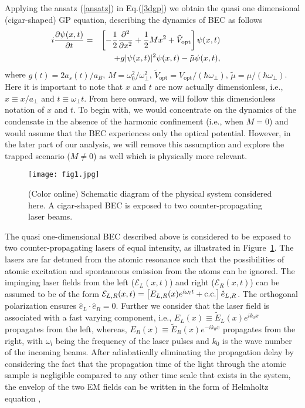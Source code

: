 \documentclass[epj]{svjour}
\begin{document}
Applying the ansatz (\ref{ansatz}) in Eq.(\ref{3dgp}) we obtain the quasi one dimensional (cigar-shaped) GP equation, describing the dynamics of BEC as follows
\begin{eqnarray}
\hskip-2cm i\frac{\partial\psi(x,t)}{\partial t} &=& \left[ - \frac{1}{2}\frac{\partial^2}{\partial x^2} + \frac{1}{2} M x^{2} + \tilde{V}_{\mathrm{opt}} \right]\psi(x,t) \nonumber \\& & + g |\psi(x,t)|^2\psi(x,t) - \tilde{\mu}\psi(x,t)\label{gp},
\end{eqnarray}
where $g(t) = 2a_s(t)/a_B$, $M = \omega^{2}_{0}/\omega^{2}_{\perp}$, $\tilde{V}_{\mathrm{opt}} = V_{\mathrm{opt}}/(\hbar \omega_{\perp})$, $\tilde{\mu}=\mu/(\hbar\omega_{\perp})$. Here it is important to note that $x$ and $t$ are now actually dimensionless, i.e., $x\equiv x/a_{\perp}$ and $t\equiv\omega_{\perp}t$. From here onward, we will follow this dimensionless notation of $x$ and $t$. To begin with,  we would concentrate on the dynamics of the condensate in the absence of the harmonic confinement (i.e., when $M = 0$) and would assume that the BEC experiences only the optical potential. However, in the later part of our analysis, we will remove this assumption and explore the trapped scenario ($M\neq 0$) as well which is physically more relevant.
\begin{figure}[t]
\begin{center}
\texttt{[image: fig1.jpg]}
\caption{(Color online) Schematic diagram of the physical system considered here. A cigar-shaped BEC is exposed to two counter-propagating laser beams.}
\label{schematic}
\end{center}
\end{figure}
The quasi one-dimensional BEC described above is considered to be exposed to two counter-propagating lasers of equal intensity, as illustrated in
Figure~\ref{schematic}. The lasers are far detuned from the atomic resonance such that the possibilities of atomic excitation and spontaneous emission from the atoms can be ignored. The impinging laser fields from the left ($\mathcal{E}_{L}(x,t)$) and right ($\mathcal{E}_{R}(x,t)$) can be assumed to be of the form $\mathcal{E}_{L,R}(x,t)=\left[E_{L,R}(x)e^{i\omega_lt}+\rm{c.c.}\right]\hat{e}_{L,R}$. The orthogonal polarization ensures $\hat{e}_L\cdot\hat{e}_R=0$. Further we consider that the laser field is associated with a fast varying component, i.e., $E_L(x)\equiv \tilde{E}_{L}(x)e^{ik_0x}$ propagates from the left, whereas, $E_R(x)\equiv \tilde{E}_{R}(x)e^{-ik_0x}$ propagates from the right, with $\omega_{l}$ being the frequency of the laser pulses and $k_0$ is the wave number of the incoming beams.  After adiabatically eliminating the propagation delay by considering the fact that the propagation time of the light through the atomic sample is negligible compared to any other time scale that exists in the system, the envelop of the two EM fields can be written in the form of Helmholtz equation \cite{ritsch1},
\end{document}
